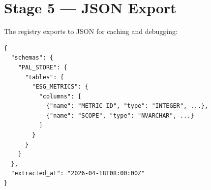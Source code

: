 \section{Stage 5 --- JSON Export}

The registry exports to JSON for caching and debugging:

\begin{lstlisting}[language=jsonx,caption={JSON export format}]
{
  "schemas": {
    "PAL_STORE": {
      "tables": {
        "ESG_METRICS": {
          "columns": [
            {"name": "METRIC_ID", "type": "INTEGER", ...},
            {"name": "SCOPE", "type": "NVARCHAR", ...}
          ]
        }
      }
    }
  },
  "extracted_at": "2026-04-18T08:00:00Z"
}
\end{lstlisting}

\newpage
